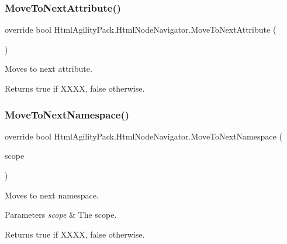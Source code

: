 \subsubsection{\texorpdfstring{Move\+To\+Next\+Attribute()}{MoveToNextAttribute()}}
{\footnotesize\ttfamily override bool Html\+Agility\+Pack.\+Html\+Node\+Navigator.\+Move\+To\+Next\+Attribute (\begin{DoxyParamCaption}{ }\end{DoxyParamCaption})\hspace{0.3cm}{\ttfamily [inline]}}



Moves to next attribute. 

\begin{DoxyReturn}{Returns}
{\ttfamily true} if X\+X\+XX, {\ttfamily false} otherwise.
\end{DoxyReturn}
\mbox{\label{class_html_agility_pack_1_1_html_node_navigator_ac9bda3370936604949129419e5391de9}} 
\subsubsection{\texorpdfstring{Move\+To\+Next\+Namespace()}{MoveToNextNamespace()}}
{\footnotesize\ttfamily override bool Html\+Agility\+Pack.\+Html\+Node\+Navigator.\+Move\+To\+Next\+Namespace (\begin{DoxyParamCaption}\item[{X\+Path\+Namespace\+Scope}]{scope }\end{DoxyParamCaption})\hspace{0.3cm}{\ttfamily [inline]}}



Moves to next namespace. 


\begin{DoxyParams}{Parameters}
{\em scope} & The scope.\\
\hline
\end{DoxyParams}
\begin{DoxyReturn}{Returns}
{\ttfamily true} if X\+X\+XX, {\ttfamily false} otherwise.
\end{DoxyReturn}
\mbox{\label{class_html_agility_pack_1_1_html_node_navigator_a8311f3f39aa7bd70759d17c8a5f818cb}} 
